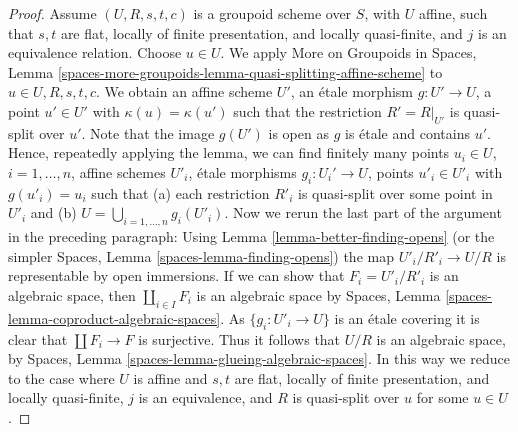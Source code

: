 \begin{proof}
\medskip\noindent
Assume $(U, R, s, t, c)$ is a groupoid scheme over $S$,
with $U$ affine, such that $s, t$ are flat, locally of finite presentation,
and locally quasi-finite, and $j$ is an equivalence relation.
Choose $u \in U$. We apply
More on Groupoids in Spaces,
Lemma \ref{spaces-more-groupoids-lemma-quasi-splitting-affine-scheme}
to $u \in U, R, s, t, c$. We obtain an affine scheme $U'$, an \'etale
morphism $g : U' \to U$, a point $u' \in U'$ with $\kappa(u) = \kappa(u')$
such that the restriction $R' = R|_{U'}$ is quasi-split over $u'$.
Note that the image $g(U')$ is open as $g$ is \'etale and contains $u'$.
Hence, repeatedly applying the lemma, we can find finitely many
points $u_i \in U$, $i = 1, \ldots, n$,
affine schemes $U'_i$, \'etale morphisms $g_i : U_i' \to U$, points
$u'_i \in U'_i$ with $g(u'_i) = u_i$ such that (a) each
restriction $R'_i$ is quasi-split over some point in $U'_i$ and
(b) $U = \bigcup_{i = 1, \ldots, n} g_i(U'_i)$.
Now we rerun the last part of the argument in the preceding paragraph:
Using
Lemma \ref{lemma-better-finding-opens}
(or the simpler
Spaces, Lemma \ref{spaces-lemma-finding-opens})
the map $U'_i/R'_i \to U/R$ is representable by open immersions.
If we can show that $F_i = U'_i/R'_i$ is an algebraic space, then
$\coprod_{i \in I} F_i$ is an algebraic space by
Spaces, Lemma \ref{spaces-lemma-coproduct-algebraic-spaces}.
As $\{g_i : U'_i \to U\}$ is an \'etale covering
it is clear that $\coprod F_i \to F$ is surjective. Thus
it follows that $U/R$ is an algebraic space, by
Spaces, Lemma \ref{spaces-lemma-glueing-algebraic-spaces}.
In this way we reduce to the case where $U$ is affine and $s, t$ are flat,
locally of finite presentation, and locally quasi-finite,
$j$ is an equivalence, and $R$ is quasi-split over $u$ for some
$u \in U$.


\end{proof}
